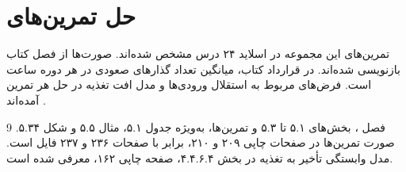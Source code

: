 \documentclass[12pt,a4paper]{article}
\newcommand{\secnum}[1]{\texorpdfstring{\mbox{\beginL#1\endL}}{#1}}
\begin{document}
\MakeAssignmentCover
\section{حل تمرین‌های }
\label{sec:power-assignment}

تمرین‌های این مجموعه در اسلاید ۲۴ درس مشخص شده‌اند. صورت‌ها از فصل
 کتاب بازنویسی شده‌اند. در قرارداد کتاب، 
میانگین تعداد گذارهای صعودی در هر دوره ساعت است. فرض‌های مربوط به
استقلال ورودی‌ها و مدل افت تغذیه در حل هر تمرین آمده‌اند
\cite[تمرین‌های فصل ۵، صفحات ۲۰۹ و ۲۱۰]{weste}
\cite[اسلاید ۲۴]{powerslides}.






\clearpage
\begin{thebibliography}{9}
\WesteReference
فصل ، بخش‌های \secnum{۵.۱} تا \secnum{۵.۳} و تمرین‌ها،
به‌ویژه جدول \secnum{۵.۱}، مثال ۵.۵ و شکل \secnum{۵.۳۴}.
صورت تمرین‌ها در صفحات چاپی ۲۰۹ و ۲۱۰، برابر با صفحات ۲۳۶ و ۲۳۷
فایل  است. مدل وابستگی تأخیر به تغذیه در بخش
\secnum{۴.۴.۶.۴}، صفحه چاپی ۱۶۲، معرفی شده است.

\end{thebibliography}
\end{document}
